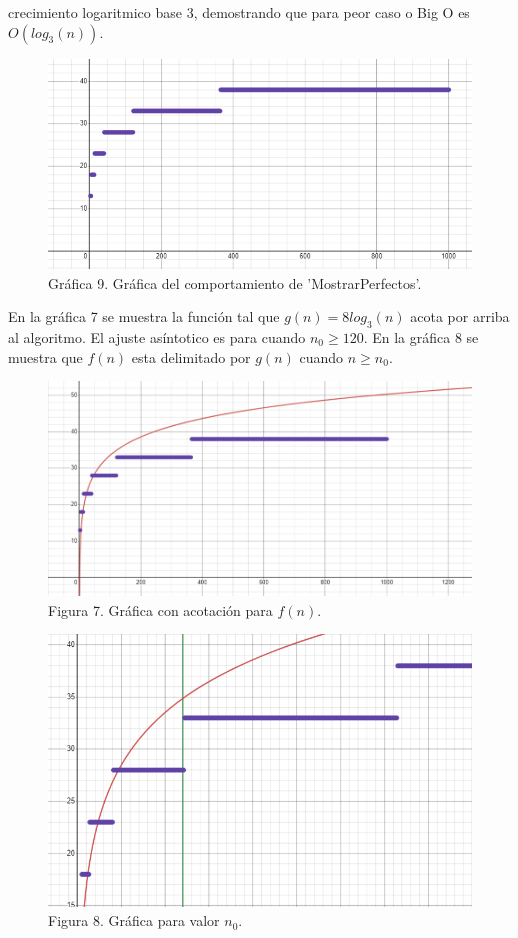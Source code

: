 \documentclass[12pt,twoside]{article}
\begin{document}
crecimiento logaritmico base 3, demostrando que para peor caso o Big O es
$O(log_3(n))$.
\begin{figure}[h]
  \begin{center}
    \includegraphics[width=0.7\linewidth]{images/busquedarecursivaworstcase.png}
    \\
    Gráfica 9. Gráfica del comportamiento de 'MostrarPerfectos'.
  \end{center}
\end{figure}

En la gráfica 7 se muestra la función tal que $g(n)=8log_3(n)$ acota por arriba al algoritmo. El ajuste asíntotico es para cuando $n_0\geq 120$. En la gráfica 8 se muestra que $f(n)$ esta delimitado por $g(n)$ cuando $n\geq n_0$.
\newpage
\begin{figure}[h]
  \begin{center}
    \includegraphics[width=0.7\linewidth]{images/busquedarecursivaworstcasegn.png}
    \\
    Figura 7. Gráfica con acotación para $f(n)$.
  \end{center}
\end{figure}
\begin{figure}[h]
  \begin{center}
    \includegraphics[width=0.7\linewidth]{images/busquedarecursivaworstcasegncota.png}
    \\
    Figura 8. Gráfica para valor $n_0$.
  \end{center}
\end{figure}
\end{document}

